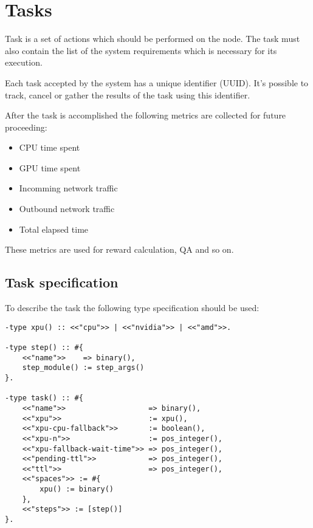 \section{Tasks}

Task is a set of actions which should be performed on the node.
The task must also contain the list of the system requirements which is necessary for its execution.

Each task accepted by the system has a unique identifier (UUID)\cite{uuid}.
It's possible to track, cancel or gather the results of the task using this identifier.

\newpage

After the task is accomplished the following metrics are collected for future proceeding:

\begin{itemize}
    \item CPU time spent
    \item GPU time spent
    \item Incomming network traffic
    \item Outbound network traffic
    \item Total elapsed time
\end{itemize}

These metrics are used for reward calculation, QA and so on.

\subsection{Task specification}

To describe the task the following type specification should be used:

\begin{verbatim}
-type xpu() :: <<"cpu">> | <<"nvidia">> | <<"amd">>.

-type step() :: #{
    <<"name">>    => binary(),
    step_module() := step_args()
}.

-type task() :: #{
    <<"name">>                   => binary(),
    <<"xpu">>                    := xpu(),
    <<"xpu-cpu-fallback">>       := boolean(),
    <<"xpu-n">>                  := pos_integer(),
    <<"xpu-fallback-wait-time">> => pos_integer(),
    <<"pending-ttl">>            => pos_integer(),
    <<"ttl">>                    => pos_integer(),
    <<"spaces">> := #{
        xpu() := binary()
    },
    <<"steps">> := [step()]
}.
\end{verbatim}

